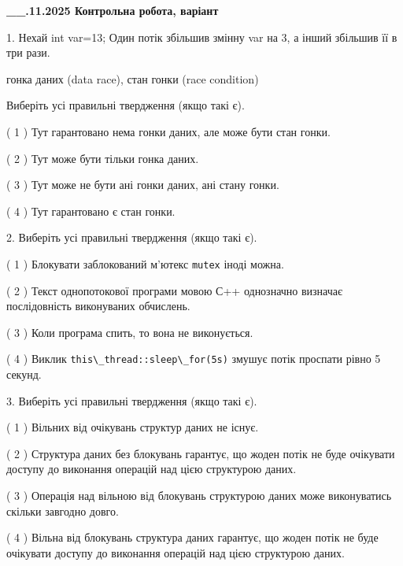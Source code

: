 \documentclass[12pt, ukrainian]{article}
\def\code#1{\Verb!#1!}
\begin{document}
\newpage
\begin {large}

\textbf{\_\_.11.2025 Контрольна робота, варіант  }\par


{
1. Нехай int var=13; Один потік збільшив змінну var на 3, а інший збільшив її в три рази.

гонка даних (data race), стан гонки (race condition)

Виберіть усі правильні твердження (якщо такі є).\par
\vspace{2mm}
( 1 ) Тут гарантовано нема гонки даних, але може бути стан гонки.%

( 2 ) Тут може бути тільки гонка даних.%

( 3 ) Тут може не бути ані гонки даних, ані стану гонки.%

( 4 ) Тут гарантовано є стан гонки.%


2. Виберіть усі правильні твердження (якщо такі є).\par
\vspace{2mm}

( 1 ) Блокувати заблокований м’ютекс  \code{mutex} іноді можна.%

( 2 ) Текст однопотокової програми мовою С++ однозначно визначає послідовність виконуваних обчислень.%

( 3 ) Коли програма спить, то вона не виконується.%

( 4 ) Виклик \code{this\_thread::sleep\_for(5s)} змушує потік проспати рівно 5 секунд.%


3. Виберіть усі правильні твердження (якщо такі є).\par
\vspace{2mm}

( 1 ) Вільних від очікувань структур даних не існує.%

( 2 ) Структура даних без блокувань гарантує, що жоден потік не буде очікувати доступу до виконання операцій над цією структурою даних.%

( 3 ) Операція над вільною від блокувань структурою даних може виконуватись скільки завгодно довго.%

( 4 ) Вільна від блокувань структура даних гарантує, що жоден потік не буде очікувати доступу до виконання операцій над цією структурою даних.%


}
\end{large}
\end{document}
